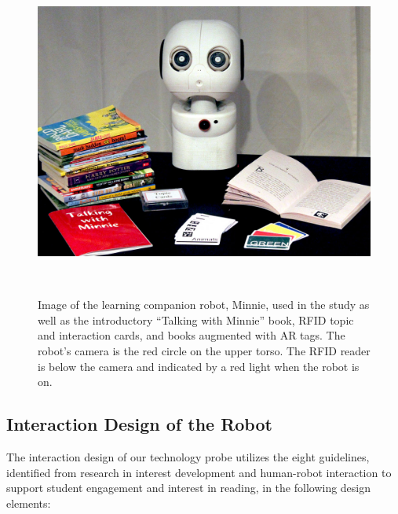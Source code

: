 \documentclass{sigchi}
\begin{document}
\begin{figure}
	\centering
	\includegraphics[width=\columnwidth]{figures/Complete-Minnie-System.jpg}
	\caption{Image of the learning companion robot, Minnie, used in the study as well as the introductory ``Talking with Minnie'' book, RFID topic and interaction cards, and books augmented with AR tags. The robot's camera is the red circle on the upper torso. The RFID reader is below the camera and indicated by a red light when the robot is on. }~\label{fig:complete-system}\vspace{-8pt}
\end{figure}

\subsection{Interaction Design of the Robot}

The interaction design of our technology probe utilizes the eight guidelines, identified from research in interest development and human-robot interaction to support student engagement and interest in reading, in the following design elements:
\end{document}
